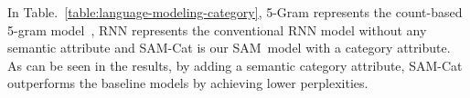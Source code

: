 \documentclass[a4paper]{article}
\newcommand{\method}{\xspace{SAM}}
\begin{document}


 In Table.~\ref{table:language-modeling-category}, 5-Gram represents the count-based 5-gram model~\cite{chen1996empirical}, RNN represents the conventional RNN model without any semantic attribute and \method-Cat is our \method~model with a category attribute. As can be seen in the results, by adding a semantic category attribute, SAM-Cat outperforms the baseline models by achieving lower perplexities.


\iffalse
\begin{figure}[t]\centering
    {
    \texttt{[image: graph/words\_category.pdf]}
    }
    \caption{Words with the largest and the least perplexity changes after introducing category attribute for PTB. The related category labels are `corporate finance', `politics', `managerment' and `daily news' (See Appendix A for the details of the category information.}
    \label{fig:word-category}
\end{figure}
\fi
\end{document}
